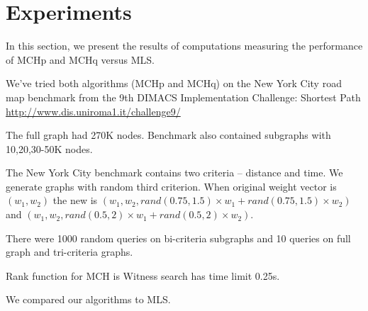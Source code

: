 

\section{Experiments}
In this section, we present the results of computations measuring the performance
of MCHp and MCHq versus MLS.

We've tried both algorithms (MCHp and MCHq) on the New York City road 
map benchmark from the 9th DIMACS Implementation
Challenge: Shortest Path 
\url{http://www.dis.uniroma1.it/challenge9/}

The full graph had 270K nodes. Benchmark also contained subgraphs with 10,20,30-50K nodes. 

The New York City benchmark contains two criteria -- distance and time. 
We generate graphs with random third criterion. 
When original weight vector is $(w_1,w_2)$ the new is 
$(w_1,w_2,rand(0.75,1.5) \times w_1 + rand(0.75,1.5) \times w_2)$ and
$(w_1,w_2,rand(0.5,2) \times w_1 + rand(0.5,2) \times w_2)$.

There were 1000 random queries on bi-criteria subgraphs and 10 queries
on full graph and tri-criteria graphs. 

Rank function for MCH is 
Witness search has time limit 0.25s. 

We compared our algorithms to MLS.

